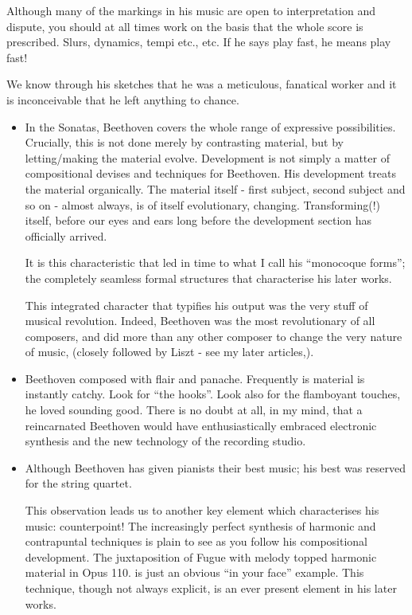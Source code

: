 \documentclass{article}
\begin{document}
Although many of the markings in his music are open to interpretation and dispute, you should at all times work on the basis that the whole score is prescribed.
Slurs, dynamics, tempi etc., etc.
If he says play fast, he means play fast!

We know through his sketches that he was a meticulous, fanatical worker and it is inconceivable that he left anything to chance.

\begin{itemize}
    \item In the Sonatas, Beethoven covers the whole range of expressive possibilities.
        Crucially, this is not done merely by contrasting material, but by letting/making the material evolve.
        Development is not simply a matter of compositional devises and techniques for Beethoven.
        His development treats the material organically.
        The material itself - first subject, second subject  and so on - almost always, is of itself evolutionary, changing.
        Transforming(!) itself, before our eyes and ears long before the development section has officially arrived.

        It is this characteristic that led in time to what I call his ``monocoque forms''; the completely seamless formal structures that characterise his later works.

        This integrated character that typifies his output was the very stuff of musical revolution.
        Indeed, Beethoven was the most revolutionary of all composers, and did more than any other composer to change the very nature of music, (closely followed by Liszt - see my later articles,).

    \item Beethoven composed with flair and panache.
        Frequently is material is instantly catchy.
        Look for ``the hooks''.
        Look also for the flamboyant touches, he loved sounding good.
        There is no doubt at all, in my mind, that a reincarnated Beethoven would have enthusiastically embraced electronic synthesis and the new technology of the recording studio.

    \item Although Beethoven has given pianists their best music; his best was reserved for the string quartet.

        This observation leads us to another key element which characterises his music: counterpoint!
        The increasingly perfect synthesis of harmonic and contrapuntal techniques is plain to see as you follow his compositional development.
        The juxtaposition of Fugue with melody topped harmonic material in Opus 110. is just an obvious ``in your face'' example.
        This technique, though not always explicit, is an ever present element in his later works.


\end{itemize}
\end{document}
